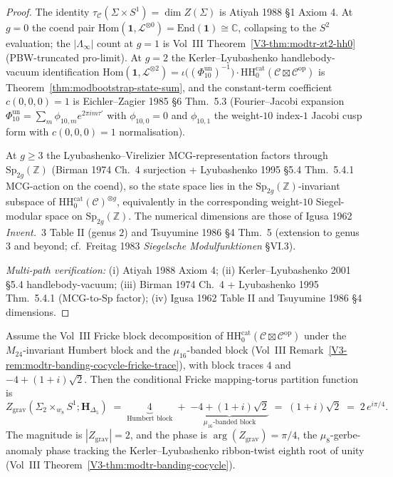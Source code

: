 \begin{proof}
The identity $\tau_{\mathcal C}(\Sigma\times S^1) = \dim Z(\Sigma)$
is Atiyah 1988 \S 1 Axiom 4. At $g = 0$ the coend pair
$\mathrm{Hom}(\mathbf 1, \mathcal L^{\otimes 0})
= \mathrm{End}(\mathbf 1)\cong\mathbb C$, collapsing to the $S^2$
evaluation; the $|\Lambda_\infty|$ count at $g = 1$ is Vol~III
Theorem~\ref{V3-thm:modtr-zt2-hh0} (PBW-truncated pro-limit). At
$g = 2$ the Kerler--Lyubashenko handlebody-vacuum identification
$\mathrm{Hom}(\mathbf 1, \mathcal L^{\otimes 2})
= \iota\bigl((\Phi_{10}^{\mathrm{un}})^{-1}\bigr)\cdot\mathrm{HH}_0^{\mathrm{cat}}
(\mathcal C\boxtimes\mathcal C^{\mathrm{op}})$ is
Theorem~\ref{thm:modbootstrap-state-sum}, and the constant-term
coefficient $c(0, 0, 0) = 1$ is Eichler--Zagier 1985 \S 6 Thm.~5.3
(Fourier--Jacobi expansion
$\Phi_{10}^{\mathrm{un}} = \sum_m\phi_{10, m}e^{2\pi im\tau'}$
with $\phi_{10, 0} = 0$ and $\phi_{10, 1}$ the weight-$10$ index-$1$
Jacobi cusp form with $c(0, 0, 0) = 1$ normalisation).

At $g\geq 3$ the Lyubashenko--Virelizier MCG-representation factors
through $\mathrm{Sp}_{2g}(\mathbb Z)$ (Birman 1974 Ch.~4 surjection
+ Lyubashenko 1995 \S 5.4 Thm.~5.4.1 MCG-action on the coend), so
the state space lies in the $\mathrm{Sp}_{2g}(\mathbb Z)$-invariant
subspace of $\mathrm{HH}_0^{\mathrm{cat}}(\mathcal C)^{\otimes g}$,
equivalently in the corresponding weight-$10$ Siegel-modular space on
$\mathrm{Sp}_{2g}(\mathbb Z)$. The numerical dimensions are those of
Igusa 1962 \emph{Invent.}~3 Table II (genus $2$) and Tsuyumine
1986 \S 4 Thm.~5 (extension to genus $3$ and beyond; cf.\
Freitag 1983 \emph{Siegelsche Modulfunktionen} \S VI.3).

\emph{Multi-path verification:}
(i) Atiyah 1988 Axiom 4;
(ii) Kerler--Lyubashenko 2001 \S 5.4 handlebody-vacuum;
(iii) Birman 1974 Ch.~4 + Lyubashenko 1995 Thm.~5.4.1
(MCG-to-Sp factor);
(iv) Igusa 1962 Table II and Tsuyumine 1986 \S 4 dimensions.
\end{proof}

\begin{theorem}
\label{thm:thqghr-fricke-explicit-trace}
Assume the Vol~III Fricke block decomposition of
$\mathrm{HH}_0^{\mathrm{cat}}
(\mathcal C\boxtimes\mathcal C^{\mathrm{op}})$ under the
$M_{24}$-invariant Humbert block and the $\mu_{16}$-banded block
(Vol~III Remark~\ref{V3-rem:modtr-banding-cocycle-fricke-trace}), with
block traces $4$ and $-4+(1+i)\sqrt2$. Then the conditional Fricke
mapping-torus partition function is
\[
 Z_{\mathrm{grav}}(\Sigma_2\times_{w_8} S^1; \mathbf H_{\Delta_5})
 \;=\;
 \underbrace{4}_{\text{Humbert block}}
 \;+\;
 \underbrace{-4 + (1+i)\sqrt 2}_{\text{$\mu_{16}$-banded block}}
 \;=\;
 (1+i)\sqrt 2
 \;=\;
 2\,e^{i\pi/4}.
\]
The magnitude is $|Z_{\mathrm{grav}}| = 2$, and the phase is
$\arg(Z_{\mathrm{grav}}) = \pi/4$, the $\mu_8$-gerbe-anomaly phase
tracking the Kerler--Lyubashenko ribbon-twist eighth root of unity
(Vol~III Theorem~\ref{V3-thm:modtr-banding-cocycle}).
\end{theorem}


